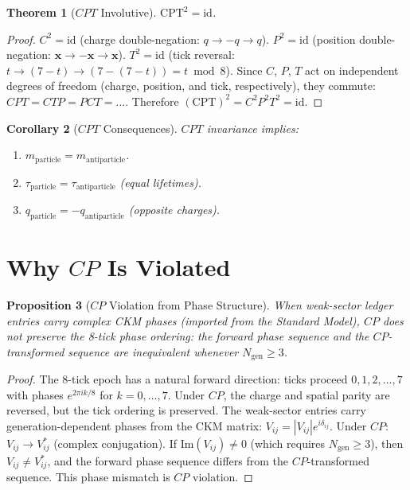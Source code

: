 \documentclass[12pt,a4paper]{article}
\newtheorem{theorem}{Theorem}[section]
\newtheorem{corollary}[theorem]{Corollary}
\newtheorem{proposition}[theorem]{Proposition}
\theoremstyle{definition}
\theoremstyle{remark}
\begin{document}
\begin{theorem}[$CPT$ Involutive]
\label{thm:involutive}
$\mathrm{CPT}^2 = \mathrm{id}$.
\end{theorem}

\begin{proof}
$C^2 = \mathrm{id}$ (charge double-negation: $q \to -q \to q$).
$P^2 = \mathrm{id}$ (position double-negation:
$\mathbf{x} \to -\mathbf{x} \to \mathbf{x}$).
$T^2 = \mathrm{id}$ (tick reversal:
$t \to (7-t) \to (7-(7-t)) = t \bmod 8$).
Since $C$, $P$, $T$ act on independent degrees of freedom (charge, position, and tick, respectively), they commute: $CPT = CTP = PCT = \ldots$.  Therefore
$(\mathrm{CPT})^2 = C^2 P^2 T^2 = \mathrm{id}$.
\end{proof}

\begin{corollary}[$CPT$ Consequences]
$CPT$ invariance implies:
\begin{enumerate}[label=(\roman*)]
  \item $m_{\mathrm{particle}} = m_{\mathrm{antiparticle}}$.
  \item $\tau_{\mathrm{particle}} = \tau_{\mathrm{antiparticle}}$
  (equal lifetimes).
  \item $q_{\mathrm{particle}} = -q_{\mathrm{antiparticle}}$
  (opposite charges).
\end{enumerate}
\end{corollary}

\section{Why $CP$ Is Violated}
\label{sec:cp-violation}

\begin{proposition}[$CP$ Violation from Phase Structure]
\label{prop:cp}
When weak-sector ledger entries carry complex CKM phases (imported from
the Standard Model), $CP$ does not preserve the 8-tick phase ordering:
the forward phase sequence and the $CP$-transformed sequence are
inequivalent whenever $N_{\mathrm{gen}} \geq 3$.
\end{proposition}

\begin{proof}
The 8-tick epoch has a natural forward direction: ticks proceed
$0, 1, 2, \ldots, 7$ with phases $e^{2\pi i k/8}$ for
$k = 0, \ldots, 7$.  Under $CP$, the charge and spatial parity
are reversed, but the tick ordering is preserved.  The weak-sector
entries carry generation-dependent phases from the CKM matrix:
$V_{ij} = |V_{ij}| e^{i\delta_{ij}}$.  Under $CP$:
$V_{ij} \to V_{ij}^*$ (complex conjugation).  If
$\mathrm{Im}(V_{ij}) \neq 0$ (which requires $N_{\mathrm{gen}}
\geq 3$), then $V_{ij} \neq V_{ij}^*$, and the forward phase
sequence differs from the $CP$-transformed sequence.  This phase
mismatch is $CP$ violation.
\end{proof}
\end{document}
